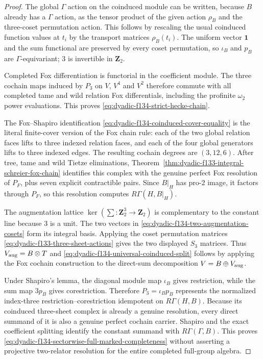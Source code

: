 \begin{proof}
The global
$\Gamma$ action
on the coinduced
module can be
written, because
$B$ already has
a $\Gamma$ action,
as the tensor
product of the
given action
$\rho_B$ and the
three-coset
permutation action.
This follows by
rescaling the
usual coinduced
function values at
$t_i$ by the
transport matrices
$\rho_B(t_i)$.
The uniform vector
$\mathbf1$ and
the sum functional
are preserved by
every coset
permutation, so
$\iota_B$ and
$p_B$ are
$\Gamma$-equivariant;
$3$ is invertible
in $\mathbf Z_2$.

Completed Fox
differentiation
is functorial in
the coefficient
module.
The three
cochain maps
induced by
$P_3$ on $V$,
$V^4$ and $V^2$
therefore commute
with all completed
tame and wild
relation Fox
differentials,
including the
profinite $\omega_2$
power evaluations.
This proves
\eqref{eq:dyadic-f134-strict-hecke-chain}.

The Fox--Shapiro
identification
\eqref{eq:dyadic-f134-coinduced-cover-equality}
is the literal
finite-cover
version of the
Fox chain rule:
each of the
two global
relation faces
lifts to three
indexed relation
faces, and each
of the four
global generators
lifts to three
indexed edges.
The resulting
cochain degrees
are $(3,12,6)$.
After tree,
tame and wild
Tietze eliminations,
Theorem~\ref{thm:dyadic-f133-integral-schreier-fox-chain}
identifies this
complex with
the genuine
perfect Fox
resolution of
$P_F$, plus
seven explicit
contractible pairs.
Since $B|_H$
has pro-$2$ image,
it factors
through $P_F$,
so this resolution
computes
$R\Gamma(H,B|_H)$.

The augmentation
lattice
$\ker(\sum:
\mathbf Z_2^3\to\mathbf Z_2)$
is complementary
to the constant
line because
$3$ is a unit.
The two vectors
in
\eqref{eq:dyadic-f134-two-augmentation-cosets}
form its
integral basis.
Applying the
coset permutation
matrices
\eqref{eq:dyadic-f133-three-sheet-actions}
gives the two
displayed $S_3$
matrices.
Thus
$V_{\rm aug}=B\otimes T$
and
\eqref{eq:dyadic-f134-universal-coinduced-split}
follows by applying
the Fox cochain
construction to
the direct-sum
decomposition
$V=B\oplus V_{\rm aug}$.

Under Shapiro's
lemma,
the diagonal
module map
$\iota_B$ gives
restriction,
while the
sum map
$3p_B$ gives
corestriction.
Therefore
$P_3=\iota_Bp_B$
represents the
normalized
index-three
restriction--corestriction
idempotent on
$R\Gamma(H,B)$.
Because its
coinduced
three-sheet complex
is already
a genuine
resolution,
every direct
summand of it
is also a genuine
perfect cochain
carrier.
Shapiro and
the exact
coefficient
splitting identify
the constant
summand with
$R\Gamma(\Gamma,B)$.
This proves
\eqref{eq:dyadic-f134-sectorwise-full-marked-completeness}
without
asserting a
projective
two-relator
resolution for
the entire
completed
full-group
algebra.


\end{proof}
